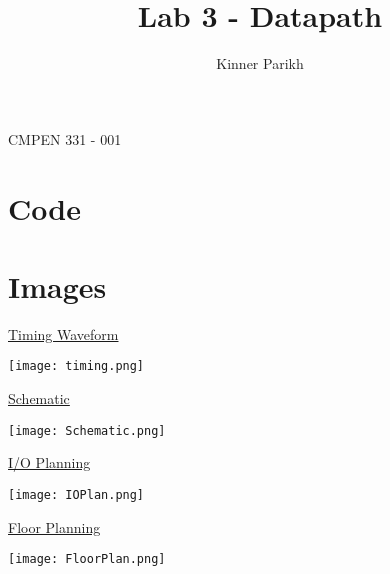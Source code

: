 \documentclass[11pt]{article}
\begin{document}
%
\author{Kinner Parikh} 
\title{Lab 3 - Datapath}
\maketitle
\begin{center}
    CMPEN 331 - 001
\end{center}

\newpage

\section{Code}


\ttfamily


\newpage

\ttfamily


\newpage

\ttfamily


\newpage

\rmfamily
\section{Images}

\begin{center}
    \underline{Timing Waveform}

    \texttt{[image: timing.png]}
    
    \newpage

    \underline{Schematic}

    \texttt{[image: Schematic.png]}

    \newpage

    \underline{I/O Planning}

    \texttt{[image: IOPlan.png]}

    \newpage

    \underline{Floor Planning}

    \texttt{[image: FloorPlan.png]}


\end{center}
\end{document}
